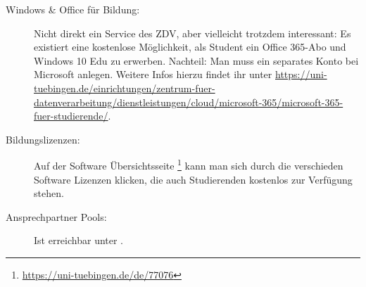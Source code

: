 \begin{description}
   
   \item[Windows \& Office für Bildung:] Nicht direkt ein Service des ZDV, aber vielleicht trotzdem interessant: Es existiert eine kostenlose Möglichkeit, als Student ein Office 365-Abo und Windows 10 Edu zu erwerben. Nachteil: Man muss ein separates Konto bei Microsoft anlegen. Weitere Infos hierzu findet ihr unter \url{https://uni-tuebingen.de/einrichtungen/zentrum-fuer-datenverarbeitung/dienstleistungen/cloud/microsoft-365/microsoft-365-fuer-studierende/}.	%


  \item[Bildungslizenzen:] Auf der Software Übersichtsseite \footnote{\url{https://uni-tuebingen.de/de/77076}} kann man sich durch die verschieden Software Lizenzen klicken, die auch Studierenden kostenlos zur Verfügung stehen.

  \item[Ansprechpartner Pools:]
    Ist erreichbar unter .

	
\end{description}
